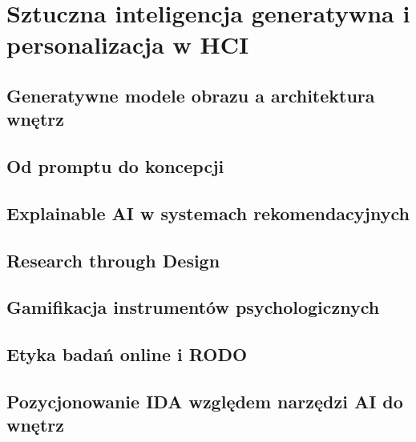 \chapter{Sztuczna inteligencja generatywna i personalizacja w HCI}
\label{ch05:top}

\section{Generatywne modele obrazu a architektura wnętrz}
\label{ch05:sec:genai}

\section{Od promptu do koncepcji}
\label{ch05:sec:prompt}

\section{Explainable AI w systemach rekomendacyjnych}
\label{ch05:sec:xai}

\section{Research through Design}
\label{ch05:sec:rtd}

\section{Gamifikacja instrumentów psychologicznych}
\label{ch05:sec:gamifikacja}

\section{Etyka badań online i RODO}
\label{ch05:sec:etyka}

\section{Pozycjonowanie IDA względem narzędzi AI do wnętrz}
\label{ch05:sec:pozycjonowanie}
